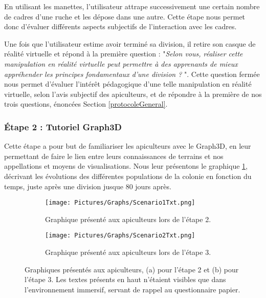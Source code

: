 		En utilisant les manettes, l'utilisateur attrape successivement une certain nombre de cadres d'une ruche et les dépose dans une autre. Cette étape nous permet donc d'évaluer différents aspects subjectifs de l'interaction avec les cadres.
		
		Une fois que l'utilisateur estime avoir terminé sa division, il retire son casque de réalité virtuelle et répond à la première question : "\textit{Selon vous, réaliser cette manipulation en réalité virtuelle peut permettre à des apprenants de mieux appréhender les principes fondamentaux d'une division ? }". Cette question fermée nous permet d'évaluer l'intérêt pédagogique d'une telle manipulation en réalité virtuelle, selon l'avis subjectif des apiculteurs, et de répondre à la première de nos trois questions, énoncées Section \ref{protocoleGeneral}.
		
		\subsubsection{Étape 2 : Tutoriel Graph3D}
		Cette étape a pour but de familiariser les apiculteurs avec le Graph3D, en leur permettant de faire le lien entre leurs connaissances de terrains et nos appellations et moyens de visualisations. Nous leur présentons le graphique \ref{sc1Txt}, décrivant les évolutions des différentes populations de la colonie en fonction du temps, juste après une division jusque 80 jours après.
		
		
		\begin{figure}
			\centering
		
			\begin{subfigure}{\textwidth}
			\centering
			\texttt{[image: Pictures/Graphs/Scenario1Txt.png]}
			\caption{Graphique présenté aux apiculteurs lors de l'étape 2.}
			\label{sc1Txt}	
			\end{subfigure}
			
			\begin{subfigure}{\textwidth}
			\centering
			\texttt{[image: Pictures/Graphs/Scenario2Txt.png]}
			\caption{Graphique présenté aux apiculteurs lors de l'étape 3.}
			\label{sc2Txt}
			\end{subfigure}
			
		\caption[Graphiques présentés aux apiculteurs, (a) pour l'étape  2 et (b) pour l'étape 3]{Graphiques présentés aux apiculteurs, (a) pour l'étape  2 et (b) pour l'étape 3. Les textes présents en haut n'étaient visibles que dans l'environnement immersif, servant de rappel au questionnaire papier.}
		\label{scsTxt}
		\end{figure}
		

